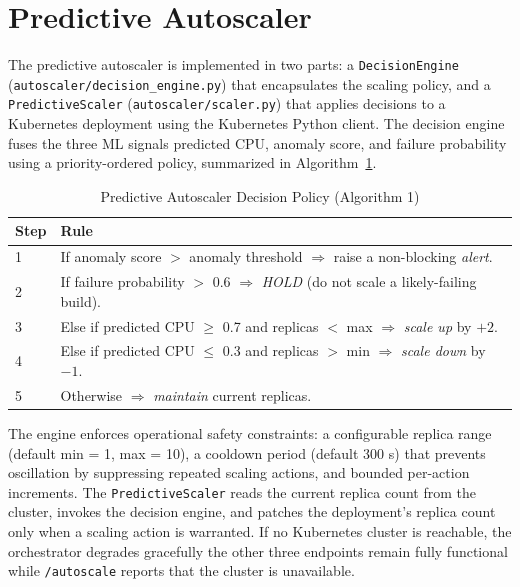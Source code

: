 \documentclass[12pt]{report}
\begin{document}
\section{Predictive Autoscaler}

The predictive autoscaler is implemented in two parts: a \texttt{DecisionEngine} (\texttt{autoscaler/decision\_engine.py}) that encapsulates the scaling policy, and a \texttt{PredictiveScaler} (\texttt{autoscaler/scaler.py}) that applies decisions to a Kubernetes deployment using the Kubernetes Python client. The decision engine fuses the three ML signals predicted CPU, anomaly score, and failure probability using a priority-ordered policy, summarized in Algorithm~\ref{alg:autoscale}.

\begin{table}[h!]
\centering
\caption{Predictive Autoscaler Decision Policy (Algorithm 1)}
\label{alg:autoscale}
\begin{tabular}{|p{1cm}|p{12.5cm}|}
\hline
\textbf{Step} & \textbf{Rule} \\
\hline
1 & If anomaly score $>$ anomaly threshold $\Rightarrow$ raise a non-blocking \emph{alert}. \\
\hline
2 & If failure probability $>$ 0.6 $\Rightarrow$ \emph{HOLD} (do not scale a likely-failing build). \\
\hline
3 & Else if predicted CPU $\geq$ 0.7 and replicas $<$ max $\Rightarrow$ \emph{scale up} by $+2$. \\
\hline
4 & Else if predicted CPU $\leq$ 0.3 and replicas $>$ min $\Rightarrow$ \emph{scale down} by $-1$. \\
\hline
5 & Otherwise $\Rightarrow$ \emph{maintain} current replicas. \\
\hline
\end{tabular}
\end{table}

The engine enforces operational safety constraints: a configurable replica range (default min = 1, max = 10), a cooldown period (default 300 s) that prevents oscillation by suppressing repeated scaling actions, and bounded per-action increments. The \texttt{PredictiveScaler} reads the current replica count from the cluster, invokes the decision engine, and patches the deployment's replica count only when a scaling action is warranted. If no Kubernetes cluster is reachable, the orchestrator degrades gracefully the other three endpoints remain fully functional while \texttt{/autoscale} reports that the cluster is unavailable.
\end{document}
